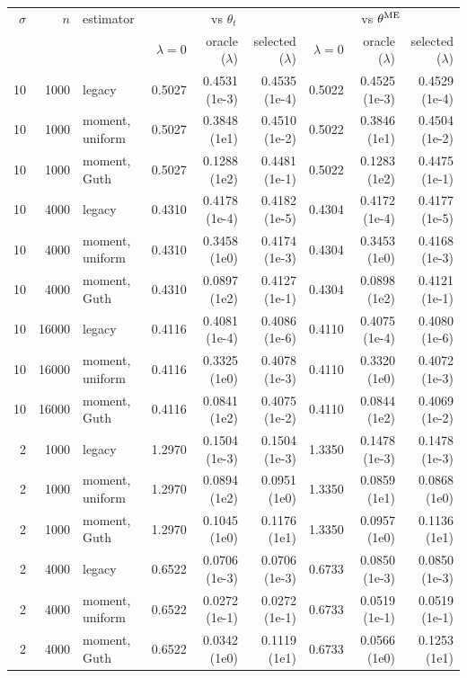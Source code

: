\begin{table}[h]\centering\scriptsize
\begin{tabular}{@{}rrlrrrrrr@{}}\toprule
$\sigma$ & $n$ & estimator & \multicolumn{3}{c}{vs $\theta_t$} & \multicolumn{3}{c}{vs $\theta^{\rm ME}$}\\
 & & & $\lambda{=}0$ & oracle ($\lambda$) & selected ($\lambda$) & $\lambda{=}0$ & oracle ($\lambda$) & selected ($\lambda$)\\\midrule
10 & 1000 & legacy & 0.5027 & 0.4531 (1e-3) & 0.4535 (1e-4) & 0.5022 & 0.4525 (1e-3) & 0.4529 (1e-4)\\
10 & 1000 & moment, uniform & 0.5027 & 0.3848 (1e1) & 0.4510 (1e-2) & 0.5022 & 0.3846 (1e1) & 0.4504 (1e-2)\\
10 & 1000 & moment, Guth & 0.5027 & 0.1288 (1e2) & 0.4481 (1e-1) & 0.5022 & 0.1283 (1e2) & 0.4475 (1e-1)\\
10 & 4000 & legacy & 0.4310 & 0.4178 (1e-4) & 0.4182 (1e-5) & 0.4304 & 0.4172 (1e-4) & 0.4177 (1e-5)\\
10 & 4000 & moment, uniform & 0.4310 & 0.3458 (1e0) & 0.4174 (1e-3) & 0.4304 & 0.3453 (1e0) & 0.4168 (1e-3)\\
10 & 4000 & moment, Guth & 0.4310 & 0.0897 (1e2) & 0.4127 (1e-1) & 0.4304 & 0.0898 (1e2) & 0.4121 (1e-1)\\
10 & 16000 & legacy & 0.4116 & 0.4081 (1e-4) & 0.4086 (1e-6) & 0.4110 & 0.4075 (1e-4) & 0.4080 (1e-6)\\
10 & 16000 & moment, uniform & 0.4116 & 0.3325 (1e0) & 0.4078 (1e-3) & 0.4110 & 0.3320 (1e0) & 0.4072 (1e-3)\\
10 & 16000 & moment, Guth & 0.4116 & 0.0841 (1e2) & 0.4075 (1e-2) & 0.4110 & 0.0844 (1e2) & 0.4069 (1e-2)\\
2 & 1000 & legacy & 1.2970 & 0.1504 (1e-3) & 0.1504 (1e-3) & 1.3350 & 0.1478 (1e-3) & 0.1478 (1e-3)\\
2 & 1000 & moment, uniform & 1.2970 & 0.0894 (1e2) & 0.0951 (1e0) & 1.3350 & 0.0859 (1e1) & 0.0868 (1e0)\\
2 & 1000 & moment, Guth & 1.2970 & 0.1045 (1e0) & 0.1176 (1e1) & 1.3350 & 0.0957 (1e0) & 0.1136 (1e1)\\
2 & 4000 & legacy & 0.6522 & 0.0706 (1e-3) & 0.0706 (1e-3) & 0.6733 & 0.0850 (1e-3) & 0.0850 (1e-3)\\
2 & 4000 & moment, uniform & 0.6522 & 0.0272 (1e-1) & 0.0272 (1e-1) & 0.6733 & 0.0519 (1e-1) & 0.0519 (1e-1)\\
2 & 4000 & moment, Guth & 0.6522 & 0.0342 (1e0) & 0.1119 (1e1) & 0.6733 & 0.0566 (1e0) & 0.1253 (1e1)\\

\end{tabular}
\end{table}
